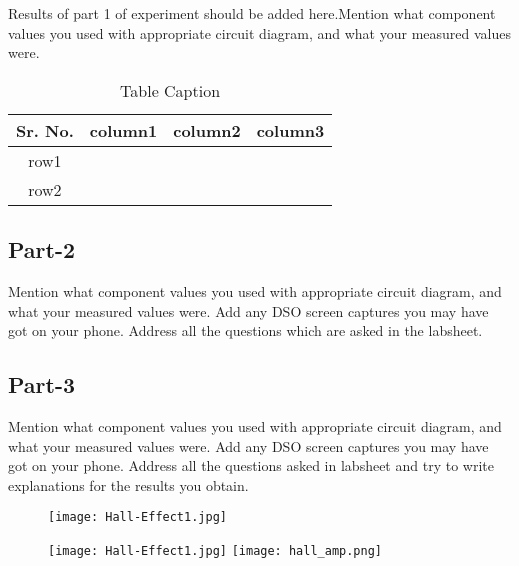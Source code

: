 \documentclass[12pt]{article}
\begin{document}
Results of part 1 of experiment should be added here.Mention what component values you used with appropriate circuit diagram, and what your measured values were.

\begin{table}[!hbt]
		\begin{center}
		\caption{Table Caption}
		\begin{tabular}{|c|c|c|c|}
			\hline
			Sr. No. & column1 & column2 & column3\\
			\hline
			row1 &  &  & \\
			\hline
			row2 &  &  & \\
			\hline
            
		\end{tabular}
		\end{center}
\end{table}


\subsection{Part-2}

Mention what component values you used with appropriate circuit diagram, and what your measured values were. Add any DSO screen captures you may have got on your phone. Address all the questions which are asked in the labsheet.\

\subsection{Part-3}

Mention what component values you used with appropriate circuit diagram, and what your measured values were. Add any DSO screen captures you may have got on your phone. Address all the questions asked in labsheet and try to write explanations for the results you obtain.\\

\begin{figure}

\centering
\texttt{[image: Hall-Effect1.jpg]}
\end{figure}
  
\begin{figure}[h]
\centering

\begin{minipage}{1.0\textwidth}
\centering
\texttt{[image: Hall-Effect1.jpg]}
\quad
\texttt{[image: hall\_amp.png]}
\label{fig:prob1_6_2}
\end{minipage}

\end{figure}
\end{document}
